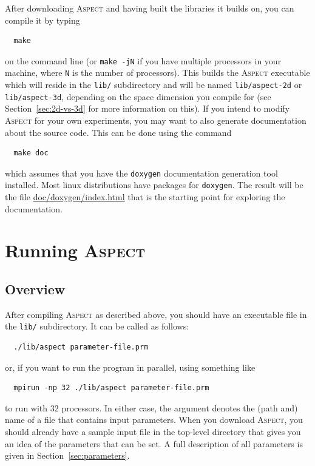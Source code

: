 \documentclass{article}
\newcommand{\aspect}{\textsc{Aspect}}
\begin{document}
After downloading \aspect{} and having built the libraries it builds on, you
can compile it by typing
\begin{verbatim}
  make
\end{verbatim}
on the command line (or \texttt{make -jN} if you have multiple processors in
your machine, where \texttt{N} is the number of processors). This builds the
\aspect{} executable which will reside in
the \texttt{lib/} subdirectory and will be named \texttt{lib/aspect-2d} or
\texttt{lib/aspect-3d}, depending on the space dimension you compile for (see
Section~\ref{sec:2d-vs-3d} for more information on this). If you intend to
modify \aspect{} for your own experiments, you may want to also generate
documentation about the source code. This can be done using the command
\begin{verbatim}
  make doc
\end{verbatim}
which assumes that you have the \texttt{doxygen} documentation generation tool
installed. Most linux distributions have packages for \texttt{doxygen}. The
result will be the file \url{doc/doxygen/index.html} that is the starting
point for exploring the documentation.


\section{Running \aspect}
\label{sec:running}

\subsection{Overview}
\label{sec:running-overview}

After compiling \aspect{} as described above, you should have an executable
file in the \texttt{lib/} subdirectory. It can be called as follows:
\begin{verbatim}
  ./lib/aspect parameter-file.prm
\end{verbatim}
or, if you want to run the program in parallel, using something like
\begin{verbatim}
  mpirun -np 32 ./lib/aspect parameter-file.prm
\end{verbatim}
to run with 32 processors. In either case, the argument denotes the (path and)
name of a file that contains input parameters. When you download \aspect, you
should already have a sample input file in the top-level directory that gives
you an idea of the parameters that can be set. A full description of all
parameters is given in Section~\ref{sec:parameters}.
\end{document}
